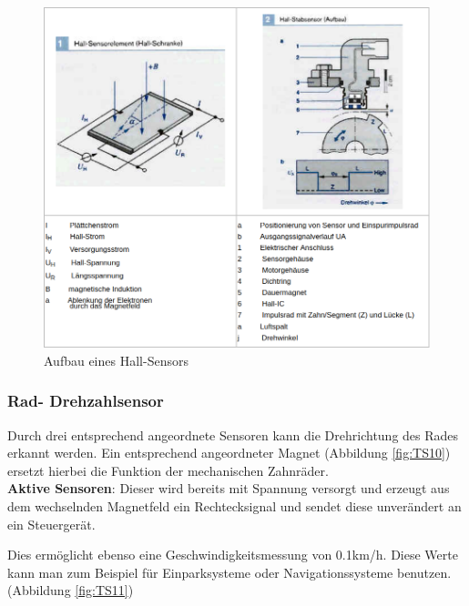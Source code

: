 				\begin{figure}
					\centering
					\includegraphics[width=\textwidth]{hall.png}
					\caption[www.kfztech.de/kfztechnik/elo/sensoren/hallsensor.htm]{Aufbau eines Hall-Sensors}
                \end{figure}
                
                \subsubsection{Rad- Drehzahlsensor}

				Durch drei entsprechend angeordnete Sensoren kann die Drehrichtung des Rades erkannt werden. Ein entsprechend angeordneter Magnet (Abbildung \ref{fig:TS10}) ersetzt hierbei die Funktion der mechanischen Zahnräder.\\
                \textbf{Aktive Sensoren}: Dieser wird bereits mit Spannung versorgt und erzeugt aus dem wechselnden Magnetfeld ein Rechtecksignal und sendet diese unverändert an ein Steuergerät.
                
				Dies ermöglicht ebenso eine Geschwindigkeitsmessung von 0.1km/h. Diese Werte kann man zum Beispiel für Einparksysteme oder Navigationssysteme benutzen.\cite{TS_drehzahl_sensor}
				(Abbildung \ref{fig:TS11})

